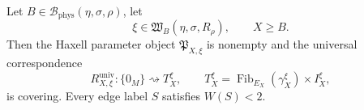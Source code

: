 \begin{proposition}\label{prop:finite-realization}
Let $B\in\mathcal B_{\mathrm{phys}}(\eta,\sigma,\rho)$, let
\[
\xi\in\mathfrak W_B(\eta,\sigma,R_\rho),
\qquad
X\ge B.
\]
Then the Haxell parameter object $\mathfrak P_{X,\xi}$ is nonempty and the universal correspondence
\[
R_{X,\xi}^{\mathrm{univ}}:\{0_M\}\rightsquigarrow T_X^\xi,
\qquad
T_X^\xi
=\operatorname{Fib}_{E_X}(\gamma_X^\xi)\times I_X^\xi,
\]
is covering.  Every edge label $S$ satisfies $W(S)<2$.
\end{proposition}
